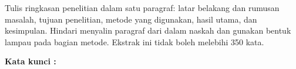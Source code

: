 %
\begin{abstractind}

Tulis ringkasan penelitian dalam satu paragraf: latar belakang dan rumusan
masalah, tujuan penelitian, metode yang digunakan, hasil utama, dan
kesimpulan. Hindari menyalin paragraf dari dalam naskah dan gunakan bentuk
lampau pada bagian metode. Ekstrak ini tidak boleh melebihi 350 kata.

\bigskip
\noindent
\textbf{Kata kunci :} \keywordindo
\end{abstractind}